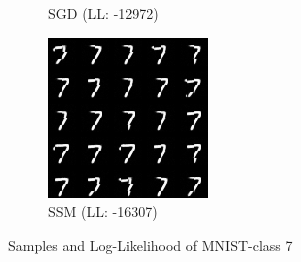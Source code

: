 \begin{figure}[H]
\begin{subfigure}[b]{0.24\textwidth}
        \caption{SGD (LL: -12972)}
    \end{subfigure}
    \begin{subfigure}[b]{0.24\textwidth}
        \centering
        \includegraphics[width=\textwidth]{figures/einsum/mnist/[7]_SSM.png}
        \caption{SSM (LL: -16307)}
    \end{subfigure}
    \caption{Samples and Log-Likelihood of MNIST-class 7}
    \label{fig:mnist7}
\end{figure}

